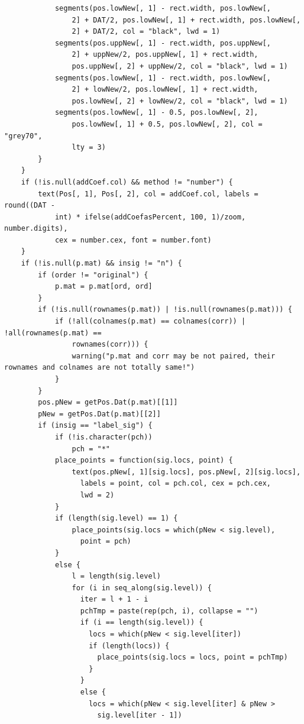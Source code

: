 \documentclass[
]{article}
\begin{document}
\begin{verbatim}
            segments(pos.lowNew[, 1] - rect.width, pos.lowNew[, 
                2] + DAT/2, pos.lowNew[, 1] + rect.width, pos.lowNew[, 
                2] + DAT/2, col = "black", lwd = 1)
            segments(pos.uppNew[, 1] - rect.width, pos.uppNew[, 
                2] + uppNew/2, pos.uppNew[, 1] + rect.width, 
                pos.uppNew[, 2] + uppNew/2, col = "black", lwd = 1)
            segments(pos.lowNew[, 1] - rect.width, pos.lowNew[, 
                2] + lowNew/2, pos.lowNew[, 1] + rect.width, 
                pos.lowNew[, 2] + lowNew/2, col = "black", lwd = 1)
            segments(pos.lowNew[, 1] - 0.5, pos.lowNew[, 2], 
                pos.lowNew[, 1] + 0.5, pos.lowNew[, 2], col = "grey70", 
                lty = 3)
        }
    }
    if (!is.null(addCoef.col) && method != "number") {
        text(Pos[, 1], Pos[, 2], col = addCoef.col, labels = round((DAT - 
            int) * ifelse(addCoefasPercent, 100, 1)/zoom, number.digits), 
            cex = number.cex, font = number.font)
    }
    if (!is.null(p.mat) && insig != "n") {
        if (order != "original") {
            p.mat = p.mat[ord, ord]
        }
        if (!is.null(rownames(p.mat)) | !is.null(rownames(p.mat))) {
            if (!all(colnames(p.mat) == colnames(corr)) | !all(rownames(p.mat) == 
                rownames(corr))) {
                warning("p.mat and corr may be not paired, their rownames and colnames are not totally same!")
            }
        }
        pos.pNew = getPos.Dat(p.mat)[[1]]
        pNew = getPos.Dat(p.mat)[[2]]
        if (insig == "label_sig") {
            if (!is.character(pch)) 
                pch = "*"
            place_points = function(sig.locs, point) {
                text(pos.pNew[, 1][sig.locs], pos.pNew[, 2][sig.locs], 
                  labels = point, col = pch.col, cex = pch.cex, 
                  lwd = 2)
            }
            if (length(sig.level) == 1) {
                place_points(sig.locs = which(pNew < sig.level), 
                  point = pch)
            }
            else {
                l = length(sig.level)
                for (i in seq_along(sig.level)) {
                  iter = l + 1 - i
                  pchTmp = paste(rep(pch, i), collapse = "")
                  if (i == length(sig.level)) {
                    locs = which(pNew < sig.level[iter])
                    if (length(locs)) {
                      place_points(sig.locs = locs, point = pchTmp)
                    }
                  }
                  else {
                    locs = which(pNew < sig.level[iter] & pNew > 
                      sig.level[iter - 1])

\end{verbatim}
\end{document}
